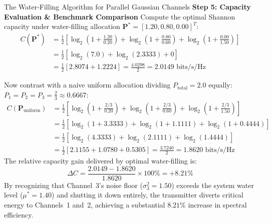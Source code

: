 \begin{examplebox}[breakable]{The Water-Filling Algorithm for Parallel Gaussian Channels}
\textbf{Step 5: Capacity Evaluation \& Benchmark Comparison}
Compute the optimal Shannon capacity under water-filling allocation $\mathbf{P}^* = [1.20, 0.80, 0.00]^T$:
\begin{align}
C(\mathbf{P}^*) &= \frac{1}{2}\left[ \log_2\left(1 + \frac{1.20}{0.20}\right) + \log_2\left(1 + \frac{0.80}{0.60}\right) + \log_2\left(1 + \frac{0.00}{1.50}\right) \right] \nonumber \\
&= \frac{1}{2}\left[ \log_2(7.0) + \log_2(2.3333) + 0 \right] \nonumber \\
&= \frac{1}{2}\left[ 2.8074 + 1.2224 \right] = \frac{4.0298}{2} = 2.0149 \text{ bits/s/Hz}
\end{align}

Now contrast with a naive uniform allocation dividing $P_{\text{total}} = 2.0$ equally: $P_1 = P_2 = P_3 = \frac{2}{3} \approx 0.6667$:
\begin{align}
C(\mathbf{P}_{\text{uniform}}) &= \frac{1}{2}\left[ \log_2\left(1 + \frac{2/3}{0.20}\right) + \log_2\left(1 + \frac{2/3}{0.60}\right) + \log_2\left(1 + \frac{2/3}{1.50}\right) \right] \nonumber \\
&= \frac{1}{2}\left[ \log_2(1 + 3.3333) + \log_2(1 + 1.1111) + \log_2(1 + 0.4444) \right] \nonumber \\
&= \frac{1}{2}\left[ \log_2(4.3333) + \log_2(2.1111) + \log_2(1.4444) \right] \nonumber \\
&= \frac{1}{2}\left[ 2.1155 + 1.0780 + 0.5305 \right] = \frac{3.7240}{2} = 1.8620 \text{ bits/s/Hz}
\end{align}
The relative capacity gain delivered by optimal water-filling is:
\begin{equation}
\Delta C = \frac{2.0149 - 1.8620}{1.8620} \times 100\% = +8.21\%
\end{equation}
By recognizing that Channel~3's noise floor ($\sigma_3^2 = 1.50$) exceeds the system water level ($\mu^* = 1.40$) and shutting it down entirely, the transmitter diverts critical energy to Channels~1 and~2, achieving a substantial $8.21\%$ increase in spectral efficiency.
\end{examplebox}

